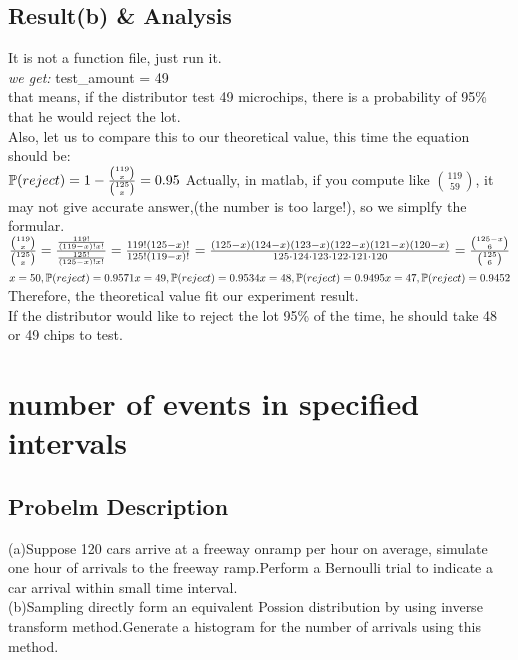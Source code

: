 \documentclass[twoside]{article}
\begin{document}
\subsection{\normalsize{Result(b) \& Analysis}}
It is not a function file, just run it.\\
\emph{we get:}
test\_amount = 49\\
that means, if the distributor test 49 microchips, there is a probability of 95\% that he would reject the lot.\\
Also, let us to compare this to our theoretical value, this time the equation should be:\\
$\mathbb{P}(reject)= 1- \frac{\binom{119}{x}}{\binom{125}{x}}= 0.95\\[10pt]$
Actually, in matlab, if you compute like $\binom{119}{59}$, it may not give accurate answer,(the number is too large!), so we simplfy the formular.\\
$\frac{\binom{119}{x}}{\binom{125}{x}}= \frac{ \frac{119!}{(119-x)!x!} }{ \frac{125!}{(125-x)!x!} } = \frac{119!(125-x)!}{125!(119-x)!} =\frac{(125-x)(124-x)(123-x)(122-x)(121-x)(120-x)}{125\cdot124\cdot123\cdot122\cdot121\cdot120}=\frac{\binom{125-x}{6}}{\binom{125}{6}}\\[15pt] $
$x = 50, \mathbb{P}(reject)=0.9571\\
x = 49, \mathbb{P}(reject)=0.9534\\
x = 48, \mathbb{P}(reject)=0.9495\\
x = 47, \mathbb{P}(reject)=0.9452\\$
Therefore, the theoretical value fit our experiment result.\\
If the distributor would like to reject the lot 95\% of the time, he should take 48 or 49 chips to test.\\

\section{number of events in specified intervals} 
\subsection{\normalsize{Probelm Description}}
(a)Suppose 120 cars arrive at a freeway onramp per hour on average, simulate one hour of arrivals to the freeway ramp.Perform a Bernoulli trial to indicate a car arrival within small time interval.\\
(b)Sampling directly form an equivalent Possion distribution by using inverse transform method.Generate a histogram for the number of arrivals using this method.\\
\end{document}
